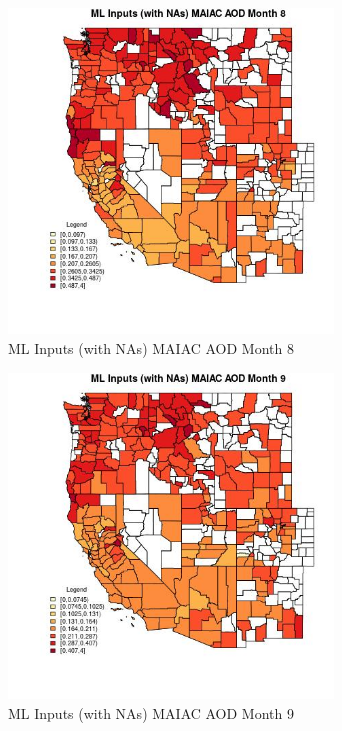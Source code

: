 \begin{figure} 
\centering  
\includegraphics[width=0.77\textwidth]{Code_Outputs/Report_ML_input_PM25_Step4_part_f_de_duplicated_aveswNAs_CountyMAIAC_AODmedianMonth8.jpg} 
\caption{\label{fig:Report_ML_input_PM25_Step4_part_f_de_duplicated_aveswNAsCountyMAIAC_AODmedianMonth8}ML Inputs (with NAs) MAIAC AOD Month 8} 
\end{figure} 
 

\clearpage 

\begin{figure} 
\centering  
\includegraphics[width=0.77\textwidth]{Code_Outputs/Report_ML_input_PM25_Step4_part_f_de_duplicated_aveswNAs_CountyMAIAC_AODmedianMonth9.jpg} 
\caption{\label{fig:Report_ML_input_PM25_Step4_part_f_de_duplicated_aveswNAsCountyMAIAC_AODmedianMonth9}ML Inputs (with NAs) MAIAC AOD Month 9} 
\end{figure} 
 

